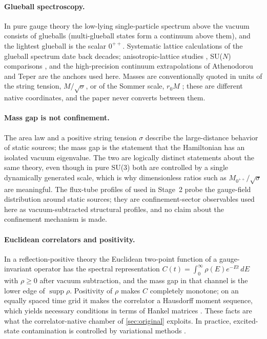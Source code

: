 \documentclass[11pt,a4paper]{article}
\theoremstyle{definition}
\theoremstyle{remark}
\newcommand{\sqs}{\sqrt{\sigma}}
\begin{document}
\paragraph{Glueball spectroscopy.} In pure gauge theory the low-lying single-particle spectrum above the vacuum consists of glueballs (multi-glueball states form a continuum above them), and the lightest glueball is the scalar $0^{++}$. Systematic lattice calculations of the glueball spectrum date back decades; anisotropic-lattice studies \cite{MorningstarPeardon99,Chen06}, SU($N$) comparisons \cite{LuciniTeperWenger04,Teper98}, and the high-precision continuum extrapolations of Athenodorou and Teper \cite{AT20} are the anchors used here. Masses are conventionally quoted in units of the string tension, $M/\sqs$, or of the Sommer scale, $r_0M$ \cite{Sommer94}; these are different native coordinates, and the paper never converts between them.

\paragraph{Mass gap is not confinement.} The area law and a positive string tension $\sigma$ \cite{Wilson74,Bali01,Greensite03} describe the large-distance behavior of static sources; the mass gap is the statement that the Hamiltonian has an isolated vacuum eigenvalue. The two are logically distinct statements about the same theory, even though in pure SU(3) both are controlled by a single dynamically generated scale, which is why dimensionless ratios such as $M_{0^{++}}/\sqs$ are meaningful. The flux-tube profiles of \cite{Cea17,Baker22,Battelli19} used in Stage~2 probe the gauge-field distribution around static sources; they are confinement-sector observables used here as vacuum-subtracted structural profiles, and no claim about the confinement mechanism is made.

\paragraph{Euclidean correlators and positivity.} In a reflection-positive theory \cite{OS73,OS75,GlimmJaffe} the Euclidean two-point function of a gauge-invariant operator has the spectral representation $C(t)=\int_0^\infty\rho(E)e^{-Et}\,dE$ with $\rho\ge0$ after vacuum subtraction, and the mass gap in that channel is the lower edge of $\operatorname{supp}\rho$. Positivity of $\rho$ makes $C$ completely monotone; on an equally spaced time grid it makes the correlator a Hausdorff moment sequence, which yields necessary conditions in terms of Hankel matrices \cite{ShohatTamarkin,Akhiezer}. These facts are what the correlator-native chamber of \cref{sec:original} exploits. In practice, excited-state contamination is controlled by variational methods \cite{LuscherWolff90}.
\end{document}
